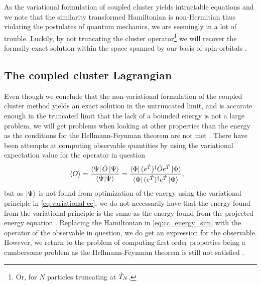             As the variational formulation of coupled cluster yields intractable
            equations and we note that the similarity transformed Hamiltonian is
            non-Hermitian thus violating the postulates of quantum mechanics, we
            are seemingly in a lot of trouble.
            Luckily, by not truncating the cluster operator\footnote{%
                Or, for $N$ particles truncating at $\hat{T}_N$.
            } we will recover the formally exact solution within the space
            spanned by our basis of spin-orbitals \cite{coester1958421,
            monkhorst1977421}.

        \subsection{The coupled cluster Lagrangian}
            Even though we conclude that the non-variational formulation of
            the coupled cluster method yields an exact solution in the
            untruncated limit, and is accurate enough in the truncated limit
            that the lack of a bounded energy is not a large problem,
            we will get problems when looking at other properties than the
            energy as the conditions for the Hellmann-Feynman theorem are not
            met \cite{helgaker-molecular}.
            There have been attempts at computing observable quantities by using
            the variational expectation value for the operator in question
            \cite{exp-value-cizek, fink1974163}
            \begin{align}
                \expval{O}
                &= \frac{\bra{\Psi}\hat{O}\ket{\Psi}}{\braket{\Psi}{\Psi}}
                = \frac{
                    \bra{\Phi} (e^{\hat{T}})^{\dagger}
                    \hat{O}
                    e^{\hat{T}}\ket{\Phi}}
                {\bra{\Phi} (e^{\hat{T}})^{\dagger} e^{\hat{T}} \ket{\Phi}},
            \end{align}
            but as $\ket{\Psi}$ is not found from optimization of the energy
            using the variational principle in \autoref{eq:variational-cc}, we
            do not necessarily have that the energy found from the variational
            principle is the same as the energy found from the projected energy
            equation \cite{kvaal2013variational}.
            Replacing the Hamiltonian in \autoref{eq:cc_energy_sim} with the
            operator of the observable in question, we do get an expression for
            the observable.
            However, we return to the problem of computing first order
            properties being a cumbersome problem as the Hellmann-Feynman
            theorem is still not satisfied \cite{helgaker-molecular,
            kvaal2013variational}.

